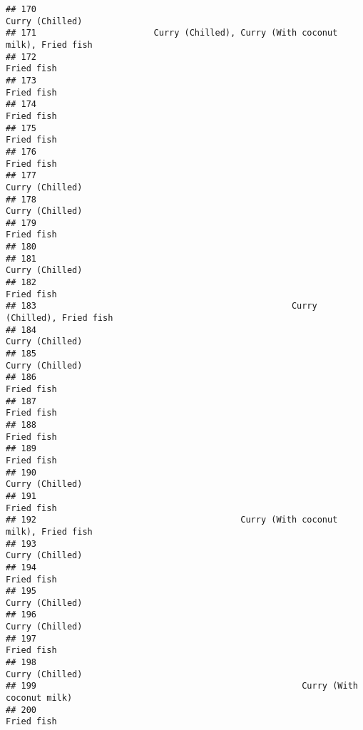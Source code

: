 \documentclass[
]{article}
\begin{document}
\begin{verbatim}
## 170                                                              Curry (Chilled)
## 171                       Curry (Chilled), Curry (With coconut milk), Fried fish
## 172                                                                   Fried fish
## 173                                                                   Fried fish
## 174                                                                   Fried fish
## 175                                                                   Fried fish
## 176                                                                   Fried fish
## 177                                                              Curry (Chilled)
## 178                                                              Curry (Chilled)
## 179                                                                   Fried fish
## 180                                                                             
## 181                                                              Curry (Chilled)
## 182                                                                   Fried fish
## 183                                                  Curry (Chilled), Fried fish
## 184                                                              Curry (Chilled)
## 185                                                              Curry (Chilled)
## 186                                                                   Fried fish
## 187                                                                   Fried fish
## 188                                                                   Fried fish
## 189                                                                   Fried fish
## 190                                                              Curry (Chilled)
## 191                                                                   Fried fish
## 192                                        Curry (With coconut milk), Fried fish
## 193                                                              Curry (Chilled)
## 194                                                                   Fried fish
## 195                                                              Curry (Chilled)
## 196                                                              Curry (Chilled)
## 197                                                                   Fried fish
## 198                                                              Curry (Chilled)
## 199                                                    Curry (With coconut milk)
## 200                                                                   Fried fish

\end{verbatim}
\end{document}
